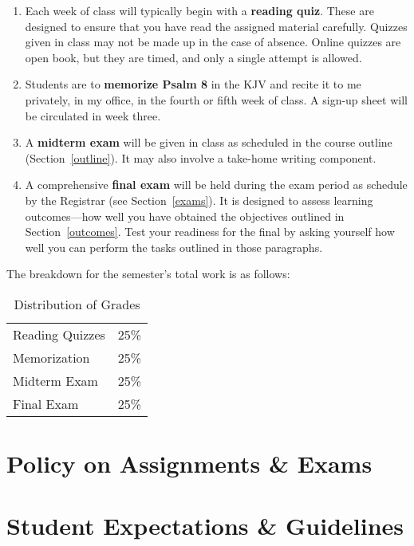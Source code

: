 \documentclass[titlepage]{article}
\newcommand\path{../../syllabus}
\begin{document}
\begin{enumerate}
 \item Each week of class will typically begin with a \textbf{reading
   quiz}. These are designed to ensure that you have read the assigned
   material carefully. Quizzes given in class may not be made up in the
   case of absence. Online quizzes are open book, but they are timed,
   and only a single attempt is allowed.
 \item Students are to \textbf{memorize Psalm 8} in the KJV and recite
   it to me privately, in my office, in the fourth or fifth week of
   class. A sign-up sheet will be circulated in week three.
 \item A \textbf{midterm exam} will be given in class as scheduled in
   the course outline (Section~\ref{outline}). It may also involve a
   take-home writing component.
 \item A comprehensive \textbf{final exam} will be held during the exam
   period as schedule by the Registrar (see Section~\ref{exams}). It is
   designed to assess learning outcomes---how well you have obtained the
   objectives outlined in Section~\ref{outcomes}. Test your readiness
   for the final by asking yourself how well you can perform the tasks
   outlined in those paragraphs.
\end{enumerate}

The breakdown for the semester's total work is as follows:

\begin{table}[htbp]
  \centering
  \begin{tabular}{lr}
    \toprule
    Reading Quizzes & 25\% \\
    Memorization    & 25\% \\
    Midterm Exam    & 25\% \\
    Final Exam      & 25\% \\
    \bottomrule
  \end{tabular}
  \caption{Distribution of Grades}
  \label{distribution}
\end{table}



\section{Policy on Assignments \& Exams}
\label{policy}





\section{Student Expectations \& Guidelines}
\label{expectations}
\end{document}
